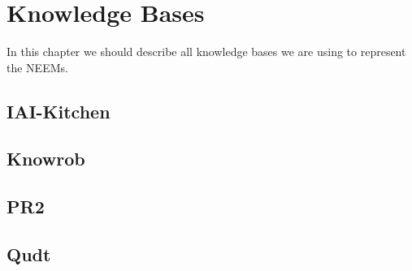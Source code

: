 \chapter{Knowledge Bases}

In this chapter we should describe all knowledge bases we are using to represent the NEEMs.

\section{IAI-Kitchen}
\section{Knowrob}
\section{PR2}
\section{Qudt}
